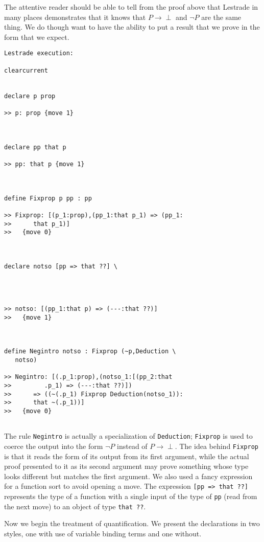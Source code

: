 \documentclass{article}
\begin{document}
The attentive reader should be able to tell from the proof above that Lestrade in many places demonstrates that it knows that
$P \rightarrow \perp$ and $\neg P$ are the same thing.  We do though want to have the ability to put a result that we prove in the form that
we expect.

\begin{verbatim}Lestrade execution:

clearcurrent


declare p prop

>> p: prop {move 1}



declare pp that p

>> pp: that p {move 1}



define Fixprop p pp : pp

>> Fixprop: [(p_1:prop),(pp_1:that p_1) => (pp_1:
>>      that p_1)]
>>   {move 0}



declare notso [pp => that ??] \
   



>> notso: [(pp_1:that p) => (---:that ??)]
>>   {move 1}



define Negintro notso : Fixprop (~p,Deduction \
   notso)

>> Negintro: [(.p_1:prop),(notso_1:[(pp_2:that
>>         .p_1) => (---:that ??)])
>>      => ((~(.p_1) Fixprop Deduction(notso_1)):
>>      that ~(.p_1))]
>>   {move 0}


\end{verbatim}

The rule {\tt Negintro} is actually a specialization of {\tt Deduction};  {\tt Fixprop} is used to coerce the output into the form $\neg P$ instead of
$P \rightarrow \perp$.  The idea behind {\tt Fixprop} is that it reads the form of its output from its first argument, while the actual proof presented to it as its second argument may prove something whose type looks different but matches the first argument.  We also used a fancy expression for a function sort
to avoid opening a move.  The expression {\tt [pp => that ??]} represents the type of a function with a single input of the type of {\tt pp} (read from the next move) to an object of type {\tt that ??}.

Now we begin the treatment of quantification.  We present the declarations in two styles, one with use of variable binding terms and one without.
\end{document}
